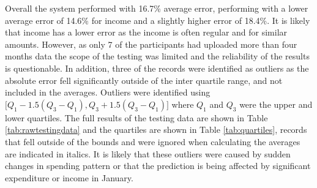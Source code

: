 Overall the system performed with 16.7\% average error, performing with a lower average error of 14.6\% for income and a slightly higher error of 18.4\%. It is likely that income has a lower error as the income is often regular and for similar amounts.
%
However, as only 7 of the participants had uploaded more than four months data the scope of the testing was limited and the reliability of the results is questionable. In addition, three of the records were identified as outliers as the absolute error fell significantly outside of the inter quartile range, and not included in the averages. Outliers were identified using $\big[ Q_1 - 1.5 (Q_3 - Q_1) , Q_3 + 1.5 (Q_3 - Q_1) \big]$ where  $Q_1$ and $Q_3$ were the upper and lower quartiles. 
%
The full results of the testing data are shown in Table \ref{tab:rawtestingdata} and the quartiles are shown in Table \ref{tab:quartiles}, records that fell outside of the bounds and were ignored when calculating the averages are indicated in italics. 
%
It is likely that these outliers were caused by sudden changes in spending pattern or that the prediction is being affected by significant expenditure or income in January.

